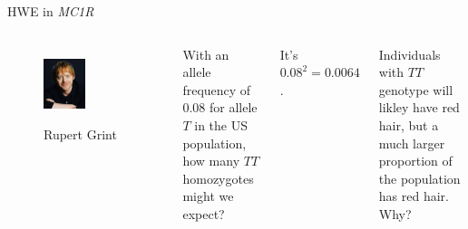 \begin{frame}{HWE in \textit{MC1R}}

        \begin{columns}


                \begin{figure}
                        \includegraphics[width=0.5\textwidth]{Pics/grint} \\
			\caption{Rupert Grint}
                \end{figure}


                \small
		With an allele frequency of $0.08$ for allele $T$ in the US population,
		how many $TT$ homozygotes might we expect?

		\pause
		It's $0.08^2=0.0064$.
		
		\bigskip

		Individuals with $TT$ genotype will likley have red hair, but a much larger
		proportion of the population has red hair. Why?

        \end{columns}

\end{frame}


